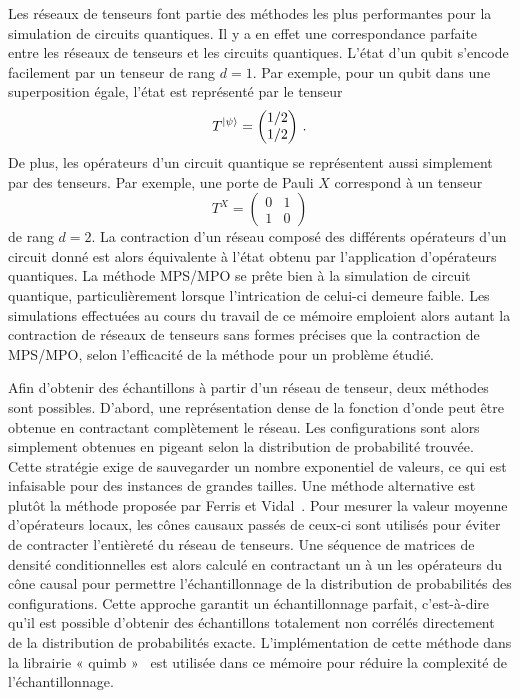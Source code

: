 Les réseaux de tenseurs font partie des méthodes les plus performantes pour la simulation de circuits quantiques. Il y a en effet une correspondance parfaite entre les réseaux de tenseurs et les circuits quantiques. L'état d'un qubit s'encode facilement par un tenseur de rang $d = 1$. Par exemple, pour un qubit dans une superposition égale, l'état est représenté par le tenseur
\begin{equation}
    T^{\ket{\psi}} = 
    \begin{pmatrix}
        1 / 2 \\
        1 / 2
    \end{pmatrix} \,.
\end{equation}
De plus, les opérateurs d'un circuit quantique se représentent aussi simplement par des tenseurs. Par exemple, une porte de Pauli $X$ correspond à un tenseur 
\begin{equation}
    T^{X} = 
    \begin{pmatrix}
        0 & 1 \\
        1 & 0
    \end{pmatrix}
\end{equation}
de rang $d = 2$. La contraction d'un réseau composé des différents opérateurs d'un circuit donné est alors équivalente à l'état obtenu par l'application d'opérateurs quantiques. La méthode MPS/MPO se prête bien à la simulation de circuit quantique, particulièrement lorsque l'intrication de celui-ci demeure faible. Les simulations effectuées au cours du travail de ce mémoire emploient alors autant la contraction de réseaux de tenseurs sans formes précises que la contraction de MPS/MPO, selon l'efficacité de la méthode pour un problème étudié.

Afin d'obtenir des échantillons à partir d'un réseau de tenseur, deux méthodes sont possibles. D'abord, une représentation dense de la fonction d'onde peut être obtenue en contractant complètement le réseau. Les configurations sont alors simplement obtenues en pigeant selon la distribution de probabilité trouvée. Cette stratégie exige de sauvegarder un nombre exponentiel de valeurs, ce qui est infaisable pour des instances de grandes tailles. Une méthode alternative est plutôt la méthode proposée par Ferris et Vidal~\cite{ferrisPerfectSamplingUnitary2012}. Pour mesurer la valeur moyenne d'opérateurs locaux, les cônes causaux passés de ceux-ci sont utilisés pour éviter de contracter l'entièreté du réseau de tenseurs. Une séquence de matrices de densité conditionnelles est alors calculé en contractant un à un les opérateurs du cône causal pour permettre l'échantillonnage de la distribution de probabilités des configurations. Cette approche garantit un échantillonnage parfait, c'est-à-dire qu'il est possible d'obtenir des échantillons totalement non corrélés directement de la distribution de probabilités exacte. L'implémentation de cette méthode dans la librairie « quimb »~\cite{grayQuimbPythonPackage2018} est utilisée dans ce mémoire pour réduire la complexité de l'échantillonnage.

